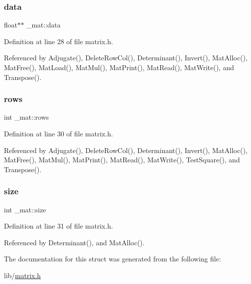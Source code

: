 \mbox{\label{struct__mat_a00dcd82a8de11b7f16f7edfde55bcfae}} 
\subsubsection{\texorpdfstring{data}{data}}
{\footnotesize\ttfamily float$\ast$$\ast$ \+\_\+mat\+::data}



Definition at line 28 of file matrix.\+h.



Referenced by Adjugate(), Delete\+Row\+Col(), Determinant(), Invert(), Mat\+Alloc(), Mat\+Free(), Mat\+Load(), Mat\+Mul(), Mat\+Print(), Mat\+Read(), Mat\+Write(), and Transpose().

\mbox{\label{struct__mat_a5e6bcb8b0c0239ca9b782c48b0b3c98a}} 
\subsubsection{\texorpdfstring{rows}{rows}}
{\footnotesize\ttfamily int \+\_\+mat\+::rows}



Definition at line 30 of file matrix.\+h.



Referenced by Adjugate(), Delete\+Row\+Col(), Determinant(), Invert(), Mat\+Alloc(), Mat\+Free(), Mat\+Mul(), Mat\+Print(), Mat\+Read(), Mat\+Write(), Test\+Square(), and Transpose().

\mbox{\label{struct__mat_ab54203ad7b60fc23832cb3b2a863857f}} 
\subsubsection{\texorpdfstring{size}{size}}
{\footnotesize\ttfamily int \+\_\+mat\+::size}



Definition at line 31 of file matrix.\+h.



Referenced by Determinant(), and Mat\+Alloc().



The documentation for this struct was generated from the following file\+:\begin{DoxyCompactItemize}
\item 
lib/\hyperlink{matrix_8h}{matrix.\+h}\end{DoxyCompactItemize}

